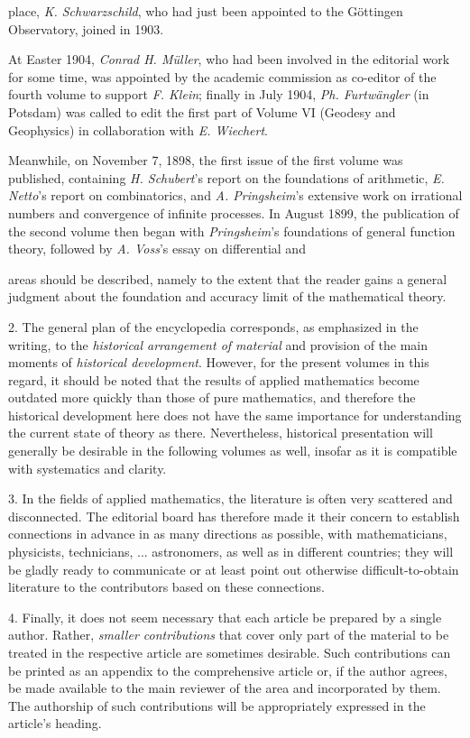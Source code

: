 \thispagestyle{fancy}

\vspace{0.5cm}

place, \textit{K. Schwarzschild}, who had just been appointed to the Göttingen Observatory, joined in 1903.

At Easter 1904, \textit{Conrad H. Müller}, who had been involved in the editorial work for some time, was appointed by the academic commission as co-editor of the fourth volume to support \textit{F. Klein}; finally in July 1904, \textit{Ph. Furtwängler} (in Potsdam) was called to edit the first part of Volume VI (Geodesy and Geophysics) in collaboration with \textit{E. Wiechert}.

Meanwhile, on November 7, 1898, the first issue of the first volume was published, containing \textit{H. Schubert}'s report on the foundations of arithmetic, \textit{E. Netto}'s report on combinatorics, and \textit{A. Pringsheim}'s extensive work on irrational numbers and convergence of infinite processes. In August 1899, the publication of the second volume then began with \textit{Pringsheim}'s foundations of general function theory, followed by \textit{A. Voss}'s essay on differential and

\vfill
\leftline{\rule{2in}{0.4pt}}
\vspace{0.2cm}
{\footnotesize 

areas should be described, namely to the extent that the reader gains a general judgment about the foundation and accuracy limit of the mathematical theory.

2. The general plan of the encyclopedia corresponds, as emphasized in the writing, to the \textit{historical arrangement of material} and provision of the main moments of \textit{historical development}. However, for the present volumes in this regard, it should be noted that the results of applied mathematics become outdated more quickly than those of pure mathematics, and therefore the historical development here does not have the same importance for understanding the current state of theory as there. Nevertheless, historical presentation will generally be desirable in the following volumes as well, insofar as it is compatible with systematics and clarity.

3. In the fields of applied mathematics, the literature is often very scattered and disconnected. The editorial board has therefore made it their concern to establish connections in advance in as many directions as possible, with mathematicians, physicists, technicians, ... astronomers, as well as in different countries; they will be gladly ready to communicate or at least point out otherwise difficult-to-obtain literature to the contributors based on these connections.

4. Finally, it does not seem necessary that each article be prepared by a single author. Rather, \textit{smaller contributions} that cover only part of the material to be treated in the respective article are sometimes desirable. Such contributions can be printed as an appendix to the comprehensive article or, if the author agrees, be made available to the main reviewer of the area and incorporated by them. The authorship of such contributions will be appropriately expressed in the article's heading.

}
